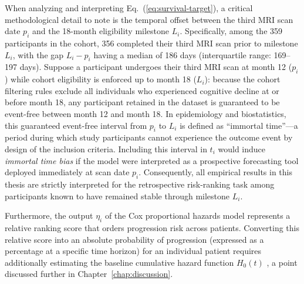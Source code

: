 When analyzing and interpreting Eq.~(\ref{eq:survival-target}), a critical methodological detail to note is the temporal offset between the third MRI scan date $p_i$ and the 18-month eligibility milestone $L_i$. Specifically, among the 359 participants in the cohort, 356 completed their third MRI scan prior to milestone $L_i$, with the gap $L_i - p_i$ having a median of 186 days (interquartile range: 169--197 days). Suppose a participant undergoes their third MRI scan at month 12 ($p_i$) while cohort eligibility is enforced up to month 18 ($L_i$): because the cohort filtering rules exclude all individuals who experienced cognitive decline at or before month 18, any participant retained in the dataset is guaranteed to be event-free between month 12 and month 18. In epidemiology and biostatistics, this guaranteed event-free interval from $p_i$ to $L_i$ is defined as ``immortal time''---a period during which study participants cannot experience the outcome event by design of the inclusion criteria. Including this interval in $t_i$ would induce \emph{immortal time bias} \cite{suissa2008immortal} if the model were interpreted as a prospective forecasting tool deployed immediately at scan date $p_i$. Consequently, all empirical results in this thesis are strictly interpreted for the retrospective risk-ranking task among participants known to have remained stable through milestone $L_i$.

Furthermore, the output $\eta_i$ of the Cox proportional hazards model represents a relative ranking score that orders progression risk across patients. Converting this relative score into an absolute probability of progression (expressed as a percentage at a specific time horizon) for an individual patient requires additionally estimating the baseline cumulative hazard function $H_0(t)$ \cite{cox1972regression}, a point discussed further in Chapter~\ref{chap:discussion}.

